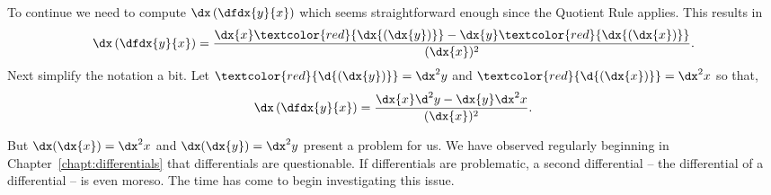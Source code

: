 
To continue we need to compute $\dx\left(\dfdx{y}{x}\right)$ which
seems straightforward enough since the Quotient Rule applies. This
results in
$$
\dx\left(\dfdx{y}{x}\right) =
\frac{\dx{x}\textcolor{red}{\dx{(\dx{y})}}-\dx{y}\textcolor{red}{\dx{(\dx{x})}}}{(\dx{x})^2}.
$$ 
Next simplify the notation a bit.  Let $\textcolor{red}{\d{(\dx{y})}}=\dx^2{y}$ and
$\textcolor{red}{\d{(\dx{x})}}=\dx^2{x}$ so that,
$$
\dx\left(\dfdx{y}{x}\right) =
\frac{\dx{x}\d^2{y}-\dx{y}\dx^2{x}}{(\dx{x})^2}.  $$

But $\dx(\dx{x}) =\dx^2x$ and $\dx(\dx{y}) =\dx^2y$ present a problem
for us.  We have observed regularly beginning in
Chapter~\ref{chapt:differentials} that differentials are
questionable. If differentials are problematic, a second differential
-- the differential of a differential -- is even moreso. The time has
come to begin investigating this issue.

